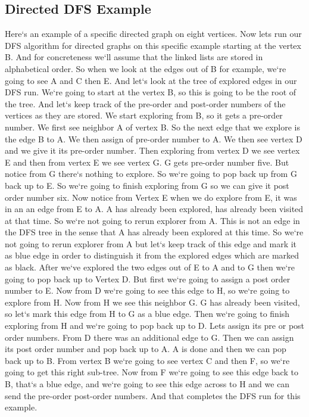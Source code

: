 \subsection{Directed DFS  Example}
Here`s an example of a specific directed graph on eight vertices.
Now lets run our DFS algorithm for directed graphs on this specific example starting at the vertex B\@.
And for concreteness we`ll assume that the linked lists are stored in alphabetical order.
So when we look at the edges out of B for example, we`re going to see A and C then E\@.
And let`s look at the tree of explored edges in our DFS run.
We`re going to start at the vertex B, so this is going to be the root of the tree.
And let`s keep track of the pre-order and post-order numbers of the vertices as they are stored.
We start exploring from B, so it gets a pre-order number.
We first see neighbor A of vertex B\@.
So the next edge that we explore is the edge B to A\@.
We then assign of pre-order number to A\@.
We then see vertex D and we give it its pre-order number.
Then exploring from vertex D we see vertex E and then from vertex E we see vertex G\@.
G gets pre-order number five.
But notice from G there`s nothing to explore.
So we`re going to pop back up from G back up to E\@.
So we`re going to finish exploring from G so we can give it post order number six.
Now notice from Vertex E when we do explore from E, it was in an an edge from E to A\@.
A has already been explored, has already been visited at that time.
So we`re not going to rerun explorer from A\@.
This is not an edge in the DFS tree in the sense that A has already been explored at this time.
So we`re not going to rerun explorer from A but let`s keep track of this edge and mark it as blue edge in order to distinguish it from the explored edges which are marked as black.
After we`ve explored the two edges out of E to A and to G then we`re going to pop back up to Vertex D\@.
But first we`re going to assign a post order number to E\@.
Now from D we`re going to see this edge to H, so we`re going to explore from H\@.
Now from H we see this neighbor G\@.
G has already been visited, so let`s mark this edge from H to G as a blue edge.
Then we`re going to finish exploring from H and we`re going to pop back up to D\@.
Lets assign its pre or post order numbers.
From D there was an additional edge to G\@.
Then we can assign its post order number and pop back up to A\@.
A is done and then we can pop back up to B\@.
From vertex B we`re going to see vertex C and then F, so we`re going to get this right sub-tree.
Now from F we`re going to see this edge back to B, that`s a blue edge, and we`re going to see this edge across to H and we can send the pre-order post-order numbers.
And that completes the DFS run for this example.

